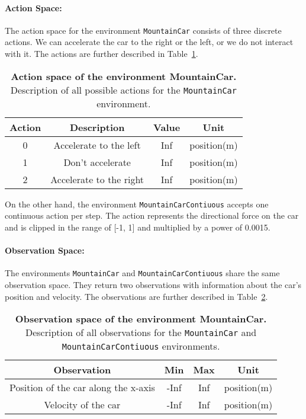 \paragraph*{Action Space:} The action space for the environment \verb|MountainCar| consists of three discrete actions. We can accelerate the car to the right or the left, or we do not interact with it. The actions are further described in Table~\ref{table:mountaincar_act}.
\begin{table}[!ht]
  \centering
  \begin{tabular}{ |c|c|c|c| }
    \hline
    Action & Description & Value & Unit \\
    \hline
    0 & Accelerate to the left & Inf & position(m) \\
    1 & Don't accelerate  & Inf & position(m) \\
    2 & Accelerate to the right  & Inf & position(m) \\
    \hline
  \end{tabular}
  \caption[Action space of the environment MountainCar]{
    \textbf{Action space of the environment MountainCar.}
    Description of all possible actions for the \texttt{MountainCar} environment.
  }
  \label{table:mountaincar_act}
\end{table}
On the other hand, the environment \verb|MountainCarContiuous| accepts one continuous action per step. The action represents the directional force on the car and is clipped in the range of [-1, 1] and multiplied by a power of 0.0015.

\paragraph*{Observation Space:} The environments \verb|MountainCar| and \verb|MountainCarContiuous| share the same observation space. They return two observations with information about the car's position and velocity. The observations are further described in Table~\ref{table:mountaincar_obs}.
\begin{table}[!ht]
  \centering
  \begin{tabular}{ |c|c|c|c| }
    \hline
    Observation & Min & Max & Unit \\
    \hline
    Position of the car along the x-axis & -Inf & Inf & position(m) \\
    Velocity of the car & -Inf & Inf & position(m) \\
    \hline
  \end{tabular}
  \caption[Observation space of the environment MountainCar]{
    \textbf{Observation space of the environment MountainCar.}
    Description of all observations for the \texttt{MountainCar} and \texttt{MountainCarContiuous} environments.
  }
  \label{table:mountaincar_obs}
\end{table}

